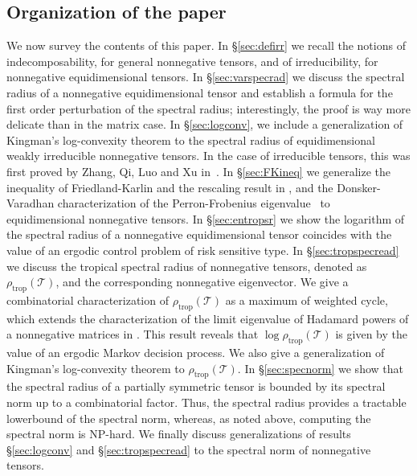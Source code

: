 \documentclass{amsart}
\newcommand{\0}{\mathbf{0}}
\newcommand{\1}{\mathbf{1}}
\newcommand{\cT}{\mathcal{T}}
\newcommand{\trop}{\mathrm{trop}}
\theoremstyle{remark}
\numberwithin{equation}{section} %
\begin{document}
 \subsection{Organization of the paper}
   We now survey the contents of this paper.  In \S\ref{sec:defirr} we recall the notions of indecomposability, for general nonnegative tensors,  and of irreducibility, for    nonnegative equidimensional  tensors. In \S\ref{sec:varspecrad} we discuss the spectral radius of a nonnegative equidimensional tensor and 
establish a formula for the first order
   perturbation of the spectral radius; interestingly, the proof is way more delicate than in the matrix case.  In \S\ref{sec:logconv}, we include
a generalization of Kingman's log-convexity theorem to the spectral radius of equidimensional weakly irreducible nonnegative tensors. In the case of irreducible tensors, this was first proved by Zhang, Qi, Luo and Xu in~\cite{ZQL10}. 
%
%
%
   In \S\ref{sec:FKineq} we generalize the inequality of Friedland-Karlin and the rescaling result in \cite{FK75}, and  the  Donsker-Varadhan characterization of the Perron-Frobenius eigenvalue~\cite{DV75} to equidimensional nonnegative tensors.  In \S\ref{sec:entropsr} we show
the logarithm of the spectral radius of  a nonnegative equidimensional tensor
coincides with the value of an ergodic control problem
of risk sensitive type.
%
%
%
%
%
%
    In \S\ref{sec:tropspecread} we discuss the tropical spectral radius of nonnegative tensors, denoted as $\rho_{\trop}(\cT)$, and the corresponding nonnegative eigenvector.   We give a combinatorial characterization of  $\rho_{\trop}(\cT)$ as a maximum of weighted cycle, which extends the characterization of the limit eigenvalue of Hadamard powers of a nonnegative matrices in \cite{Fri86}. 
This result reveals that $\log \rho_{\trop}(\cT)$ is given by the
value of an ergodic Markov decision process. 
%
%
%
%
%
We also give a generalization of Kingman's log-convexity theorem to $\rho_{\trop}(\cT)$.
   In \S\ref{sec:specnorm} we show that the spectral radius of a partially symmetric tensor is bounded by its spectral norm up to a combinatorial factor.
%
Thus, the spectral radius provides a tractable lowerbound of the spectral norm,
whereas, as noted above, computing the spectral norm is NP-hard.
%
%
%
We finally discuss generalizations of results \S\ref{sec:logconv} and \S\ref{sec:tropspecread} to the spectral norm
   of nonnegative tensors.
 
 
 
\end{document}
